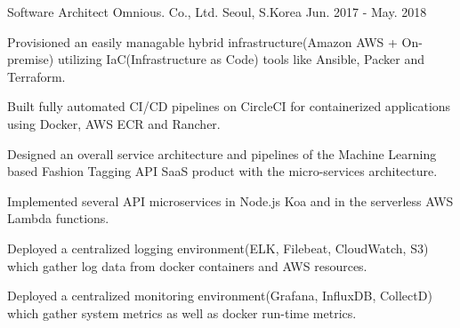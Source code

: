 

\begin{cventries}

  \cventry
    {Software Architect} %
    {Omnious. Co., Ltd.} %
    {Seoul, S.Korea} %
    {Jun. 2017 - May. 2018} %
    {
      \begin{cvitems} %
        \item {Provisioned an easily managable hybrid infrastructure(Amazon AWS + On-premise) utilizing IaC(Infrastructure as Code) tools like Ansible, Packer and Terraform.}
        \item {Built fully automated CI/CD pipelines on CircleCI for containerized applications using Docker, AWS ECR and Rancher.}
        \item {Designed an overall service architecture and pipelines of the Machine Learning based Fashion Tagging API SaaS product with the micro-services architecture.}
        \item {Implemented several API microservices in Node.js Koa and in the serverless AWS Lambda functions.}
        \item {Deployed a centralized logging environment(ELK, Filebeat, CloudWatch, S3) which gather log data from docker containers and AWS resources.}
        \item {Deployed a centralized monitoring environment(Grafana, InfluxDB, CollectD) which gather system metrics as well as docker run-time metrics.}
      \end{cvitems}
    }


\end{cventries}
